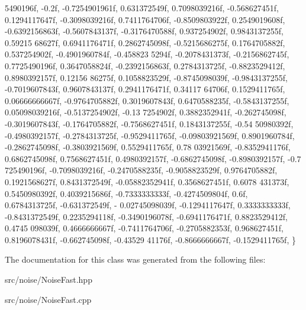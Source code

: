 \begin{DoxyCode}
      5490196f, -0.2f, -0.7254901961f, 0.631372549f, 0.7098039216f, -0.568627451f, 0.1294117647f, -0.3098039216f, 
      0.7411764706f, -0.8509803922f,
        0.2549019608f, -0.6392156863f, -0.5607843137f, -0.3176470588f, 0.937254902f, 0.9843137255f, 0.59215
      68627f, 0.6941176471f, 0.2862745098f, -0.5215686275f, 0.1764705882f, 0.537254902f, -0.4901960784f, -0.458823
      5294f, -0.2078431373f, -0.2156862745f,
        0.7725490196f, 0.3647058824f, -0.2392156863f, 0.2784313725f, -0.8823529412f, 0.8980392157f, 0.12156
      86275f, 0.1058823529f, -0.8745098039f, -0.9843137255f, -0.7019607843f, 0.9607843137f, 0.2941176471f, 0.34117
      64706f, 0.1529411765f, 0.06666666667f,
        -0.9764705882f, 0.3019607843f, 0.6470588235f, -0.5843137255f, 0.05098039216f, -0.5137254902f, -0.13
      7254902f, 0.3882352941f, -0.262745098f, -0.3019607843f, -0.1764705882f, -0.7568627451f, 0.1843137255f, -0.54
      50980392f, -0.4980392157f, -0.2784313725f,
        -0.9529411765f, -0.09803921569f, 0.8901960784f, -0.2862745098f, -0.3803921569f, 0.5529411765f, 0.78
      03921569f, -0.8352941176f, 0.6862745098f, 0.7568627451f, 0.4980392157f, -0.6862745098f, -0.8980392157f, -0.7
      725490196f, -0.7098039216f, -0.2470588235f,
        -0.9058823529f, 0.9764705882f, 0.1921568627f, 0.8431372549f, -0.05882352941f, 0.3568627451f, 0.6078
      431373f, 0.5450980392f, 0.4039215686f, -0.7333333333f, -0.4274509804f, 0.6f, 0.6784313725f, -0.631372549f, -
      0.02745098039f, -0.1294117647f,
        0.3333333333f, -0.8431372549f, 0.2235294118f, -0.3490196078f, -0.6941176471f, 0.8823529412f, 0.4745
      098039f, 0.4666666667f, -0.7411764706f, -0.2705882353f, 0.968627451f, 0.8196078431f, -0.662745098f, -0.43529
      41176f, -0.8666666667f, -0.1529411765f,
    \}
\end{DoxyCode}


The documentation for this class was generated from the following files\+:\begin{DoxyCompactItemize}
\item 
src/noise/Noise\+Fast.\+hpp\item 
src/noise/Noise\+Fast.\+cpp\end{DoxyCompactItemize}
